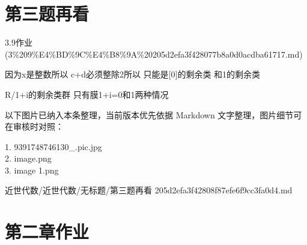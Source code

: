 \section*{第三题再看}

\begin{note}[来源上级主题]

3.9作业 (3\%209\%E4\%BD\%9C\%E4\%B8\%9A\%20205d2efa3f428077b8a0d0acdba61717.md)

\end{note}

\begin{homework}

因为x是整数所以 c+d必须整除2所以 只能是[0]的剩余类 和1的剩余类

R/1+i的剩余类群 只有膜1+i=0和1两种情况

\end{homework}

\begin{note}[关联图片]
以下图片已纳入本条整理，当前版本优先依据 Markdown 文字整理，图片细节可在审核时对照：

1. 9391748746130\_.pic.jpg\\
2. image.png\\
3. image 1.png\\

\end{note}

\begin{note}[来源路径]

近世代数/近世代数/无标题/第三题再看 205d2efa3f42808f87efe6f9cc3fa0d4.md

\end{note}

\section*{第二章作业}

